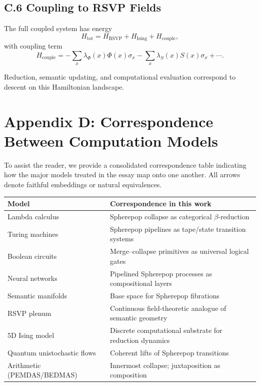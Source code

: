 \documentclass[12pt,letterpaper]{article}
\begin{document}
\subsection*{C.6 Coupling to RSVP Fields}
The full coupled system has energy
\[
H_{\text{tot}}
=
H_{\text{RSVP}}
+ H_{\text{Ising}}
+ H_{\text{couple}},
\]
with coupling term
\[
H_{\text{couple}}
=
-\sum_{x}\lambda_\Phi(x)\Phi(x)\sigma_x
-\sum_{x}\lambda_S(x)S(x)\sigma_x
+ \cdots.
\]

Reduction, semantic updating, and computational evaluation correspond to
descent on this Hamiltonian landscape.


\section{Appendix D: Correspondence Between Computation Models}

To assist the reader, we provide a consolidated correspondence table indicating
how the major models treated in the essay map onto one another.  
All arrows denote faithful embeddings or natural equivalences.

\begin{center}
\begin{tabular}{ll}
\toprule
\textbf{Model} & \textbf{Correspondence in this work} \\
\midrule
Lambda calculus  
& Spherepop collapse as categorical $\beta$-reduction \\
Turing machines  
& Spherepop pipelines as tape/state transition systems \\
Boolean circuits  
& Merge--collapse primitives as universal logical gates \\
Neural networks  
& Pipelined Spherepop processes as compositional layers \\
Semantic manifolds  
& Base space for Spherepop fibrations \\
RSVP plenum  
& Continuous field-theoretic analogue of semantic geometry \\
5D Ising model  
& Discrete computational substrate for reduction dynamics \\
Quantum unistochastic flows  
& Coherent lifts of Spherepop transitions \\
Arithmetic (PEMDAS/BEDMAS)  
& Innermost collapse; juxtaposition as composition \\
\bottomrule
\end{tabular}
\end{center}
\end{document}
